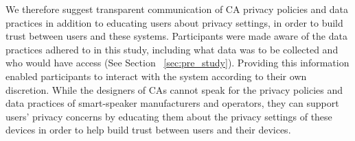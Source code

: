         We therefore suggest transparent communication of \ac{CA} privacy policies and data practices in addition to educating users about privacy settings, in order to build trust between users and these systems. Participants were made aware of the data practices adhered to in this study, including what data was to be collected and who would have access (See Section ~\ref{sec:pre_study}). Providing this information enabled participants to interact with the system according to their own discretion. While the designers of \ac{CA}s cannot speak for the privacy policies and data practices of smart-speaker manufacturers and operators, they can support users' privacy concerns by educating them about the privacy settings of these devices in order to help build trust between users and their devices. %




